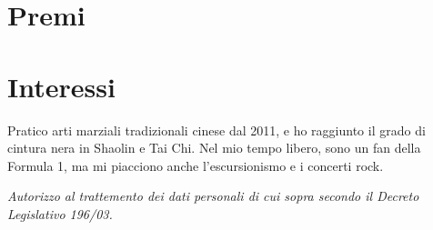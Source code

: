 \documentclass[a4paper,italian]{twentysecondcv} %
\begin{document}

\section{Premi}

\begin{twentyshort} %
\end{twentyshort}


\section{Interessi}

Pratico arti marziali tradizionali cinese dal 2011, e ho raggiunto il grado di cintura nera in Shaolin e Tai Chi. Nel mio tempo libero, sono un fan della Formula 1, ma mi piacciono anche l'escursionismo e i concerti rock.






\vspace*{\fill}
\begin{center}
{\footnotesize \itshape Autorizzo al trattemento dei dati personali di cui sopra secondo il Decreto Legislativo 196/03.}
\end{center}
\end{document}
